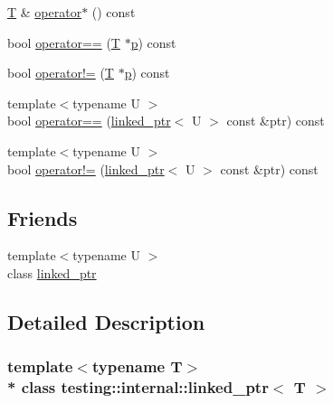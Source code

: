 \begin{DoxyCompactItemize}
\hyperlink{functions__7_8js_adf1f3edb9115acb0a1e04209b7a9937b}{T} \& \hyperlink{classtesting_1_1internal_1_1linked__ptr_aec393cbd60f96defde36ef8a69d94254}{operator$\ast$} () const 
\item 
bool \hyperlink{classtesting_1_1internal_1_1linked__ptr_abe2154fd3ad3574dfe6f2320bc1debc4}{operator==} (\hyperlink{functions__7_8js_adf1f3edb9115acb0a1e04209b7a9937b}{T} $\ast$\hyperlink{jquery_8js_a2335e57f79b6acfb6de59c235dc8a83e}{p}) const 
\item 
bool \hyperlink{classtesting_1_1internal_1_1linked__ptr_a3685f9661bbe410cfa58fea2f14396b7}{operator!=} (\hyperlink{functions__7_8js_adf1f3edb9115acb0a1e04209b7a9937b}{T} $\ast$\hyperlink{jquery_8js_a2335e57f79b6acfb6de59c235dc8a83e}{p}) const 
\item 
{\footnotesize template$<$typename U $>$ }\\bool \hyperlink{classtesting_1_1internal_1_1linked__ptr_a3b46c9ecfd928673a524dcb3c70fd2ad}{operator==} (\hyperlink{classtesting_1_1internal_1_1linked__ptr}{linked\+\_\+ptr}$<$ U $>$ const \&ptr) const 
\item 
{\footnotesize template$<$typename U $>$ }\\bool \hyperlink{classtesting_1_1internal_1_1linked__ptr_a6449584b90a09a313300599fb3a23633}{operator!=} (\hyperlink{classtesting_1_1internal_1_1linked__ptr}{linked\+\_\+ptr}$<$ U $>$ const \&ptr) const 
\end{DoxyCompactItemize}
\subsection*{Friends}
\begin{DoxyCompactItemize}
\item 
{\footnotesize template$<$typename U $>$ }\\class \hyperlink{classtesting_1_1internal_1_1linked__ptr_a7763f286ca03a7f7363a033d996c8c1c}{linked\+\_\+ptr}
\end{DoxyCompactItemize}


\subsection{Detailed Description}
\subsubsection*{template$<$typename T$>$\\*
class testing\+::internal\+::linked\+\_\+ptr$<$ T $>$}




